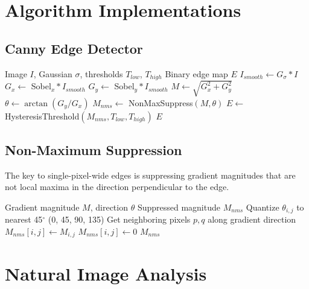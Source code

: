 \documentclass[a4paper, 11pt]{article}
\begin{document}
\section{Algorithm Implementations}

\subsection{Canny Edge Detector}

\begin{algorithm}
\caption{Canny Edge Detection}
\begin{algorithmic}[1]
\Require Image $I$, Gaussian $\sigma$, thresholds $T_{low}$, $T_{high}$
\Ensure Binary edge map $E$
\State $I_{smooth} \gets G_\sigma * I$ 
\State $G_x \gets$ Sobel$_x * I_{smooth}$
\State $G_y \gets$ Sobel$_y * I_{smooth}$
\State $M \gets \sqrt{G_x^2 + G_y^2}$ 
\State $\theta \gets \arctan(G_y / G_x)$ 
\State $M_{nms} \gets$ NonMaxSuppress$(M, \theta)$ 
\State $E \gets$ HysteresisThreshold$(M_{nms}, T_{low}, T_{high})$ 
\State \Return $E$
\end{algorithmic}
\end{algorithm}

\subsection{Non-Maximum Suppression}

The key to single-pixel-wide edges is suppressing gradient magnitudes that are not local maxima
in the direction perpendicular to the edge.

\begin{algorithm}
\caption{Non-Maximum Suppression}
\begin{algorithmic}[1]
\Require Gradient magnitude $M$, direction $\theta$
\Ensure Suppressed magnitude $M_{nms}$
    \State Quantize $\theta_{i,j}$ to nearest 45$^\circ$ (0, 45, 90, 135)
    \State Get neighboring pixels $p, q$ along gradient direction
        \State $M_{nms}[i,j] \gets M_{i,j}$ 
    \Else
        \State $M_{nms}[i,j] \gets 0$ 
    \EndIf
\EndFor
\State \Return $M_{nms}$
\end{algorithmic}
\end{algorithm}

\section{Natural Image Analysis}
\end{document}
